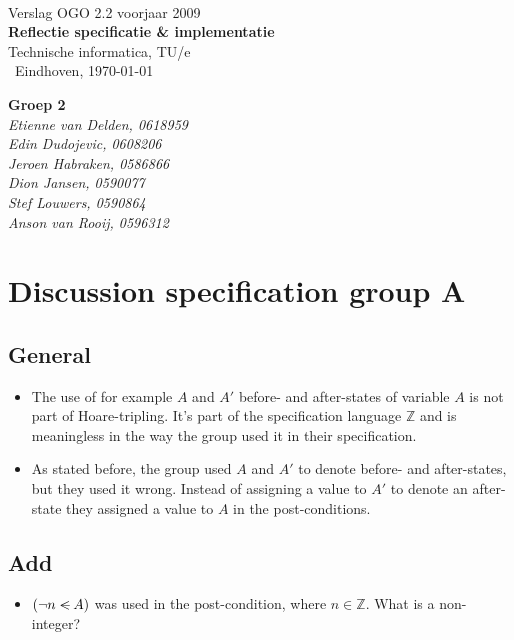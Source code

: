 \documentclass[a4paper,twoside,11pt]{article}
\begin{document}
   \begin{titlepage}
        {\ }\\[5.0cm]
        { {\Large Verslag OGO 2.2 voorjaar 2009}}\\[0.2cm]
        {\bf \Huge Reflectie specificatie \& implementatie}\\[0.1cm]
        { {\Large {Technische informatica, TU/e} }}\\[1.0cm]
        {\ Eindhoven, \today }\\[0.2cm]
        \begin{flushright}
            {\bf {\small Groep 2 }}\\[0.0cm]
            {\em {\small Etienne van Delden, 0618959}}\\
            {\em {\small Edin Dudojevic, 0608206}}\\
            {\em {\small Jeroen Habraken, 0586866}}\\
            {\em {\small Dion Jansen, 0590077 }}\\
            {\em {\small Stef Louwers, 0590864}}\\
            {\em {\small Anson van Rooij, 0596312}}\\[0.5cm]
        \end{flushright}
    \end{titlepage}
\newpage
    \setcounter{tocdepth}{1}
    \tableofcontents
\newpage
\section{Discussion specification group A}
\subsection{General}
\begin{itemize}
    \item The use of for example $A$ and $A'$ before- and after-states of variable $A$ is not part of Hoare-tripling. It's part of the specification language $\mathbb{Z}$ and is meaningless in the way the group used it in their specification.
    \item As stated before, the group used $A$ and $A'$ to denote before- and after-states, but they used it wrong. Instead of assigning a value to $A'$ to denote an after-state they assigned a value to $A$ in the post-conditions.
\end{itemize}
\subsection{Add}
\begin{itemize}
    \item $(\neg n <\!\!\!\!\!\!-\, A)$ was used in the post-condition, where $n \in \mathbb{Z}$. What is a non-integer?
\end{itemize}
\end{document}
